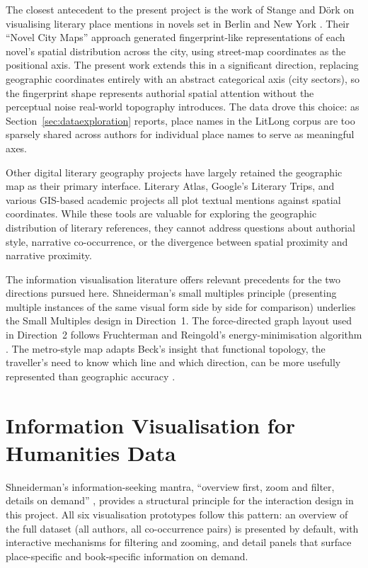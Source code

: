 \documentclass[logo,msc]{infthesis}
\begin{document}
The closest antecedent to the present project is the work of Stange and D{\"o}rk on visualising literary place mentions in novels set in Berlin and New York \cite{stange2015}. Their ``Novel City Maps'' approach generated fingerprint-like representations of each novel's spatial distribution across the city, using street-map coordinates as the positional axis. The present work extends this in a significant direction, replacing geographic coordinates entirely with an abstract categorical axis (city sectors), so the fingerprint shape represents authorial spatial attention without the perceptual noise real-world topography introduces. The data drove this choice: as Section~\ref{sec:dataexploration} reports, place names in the LitLong corpus are too sparsely shared across authors for individual place names to serve as meaningful axes.
 
Other digital literary geography projects have largely retained the geographic map as their primary interface. Literary Atlas, Google's Literary Trips, and various GIS-based academic projects all plot textual mentions against spatial coordinates. While these tools are valuable for exploring the geographic distribution of literary references, they cannot address questions about authorial style, narrative co-occurrence, or the divergence between spatial proximity and narrative proximity.
 
The information visualisation literature offers relevant precedents for the two directions pursued here. Shneiderman's small multiples principle \cite{tufte1983} (presenting multiple instances of the same visual form side by side for comparison) underlies the Small Multiples design in Direction~1. The force-directed graph layout used in Direction~2 follows Fruchterman and Reingold's energy-minimisation algorithm \cite{fruchterman1991}. The metro-style map adapts Beck's insight that functional topology, the traveller's need to know which line and which direction, can be more usefully represented than geographic accuracy \cite{beck1933}.
 
\section{Information Visualisation for Humanities Data}
 
Shneiderman's information-seeking mantra, ``overview first, zoom and filter, details on demand'' \cite{shneiderman1996}, provides a structural principle for the interaction design in this project. All six visualisation prototypes follow this pattern: an overview of the full dataset (all authors, all co-occurrence pairs) is presented by default, with interactive mechanisms for filtering and zooming, and detail panels that surface place-specific and book-specific information on demand.
 
\end{document}
